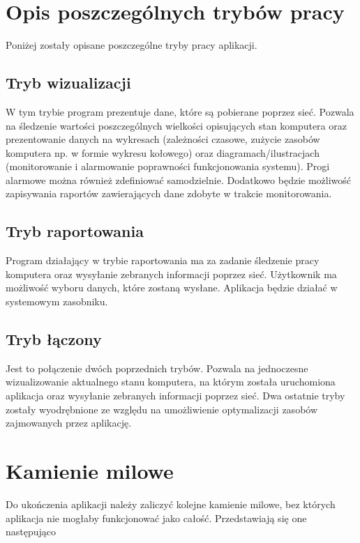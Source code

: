 \documentclass[a4paper]{article}
\begin{document}
	\section{Opis poszczególnych trybów pracy}
	Poniżej zostały opisane poszczególne tryby pracy aplikacji.
	
	\subsection{Tryb wizualizacji}
		W tym trybie program prezentuje dane, które są pobierane poprzez sieć. Pozwala na śledzenie wartości poszczególnych wielkości opisujących stan komputera oraz prezentowanie danych na wykresach (zależności czasowe, zużycie zasobów komputera np. w formie wykresu kołowego) oraz diagramach/ilustracjach (monitorowanie i alarmowanie poprawności funkcjonowania systemu). Progi alarmowe można również zdefiniować samodzielnie. Dodatkowo będzie możliwość zapisywania raportów zawierających dane zdobyte w trakcie monitorowania.
	
	\subsection{Tryb raportowania}
		Program działający w trybie raportowania ma za zadanie śledzenie pracy komputera oraz wysyłanie zebranych informacji poprzez sieć. Użytkownik ma możliwość wyboru danych, które zostaną wysłane. Aplikacja będzie działać w systemowym zasobniku.
	
	\subsection{Tryb łączony}
		Jest to połączenie dwóch poprzednich trybów. Pozwala na jednoczesne wizualizowanie aktualnego stanu komputera, na którym została uruchomiona aplikacja oraz wysyłanie zebranych informacji poprzez sieć. Dwa ostatnie tryby zostały wyodrębnione ze względu na umożliwienie optymalizacji zasobów zajmowanych przez aplikację.
	
	\section{Kamienie milowe}
		Do ukończenia aplikacji należy zaliczyć kolejne kamienie milowe, bez których aplikacja nie mogłaby funkcjonować jako całość. Przedstawiają się one następująco
		
\end{document}

